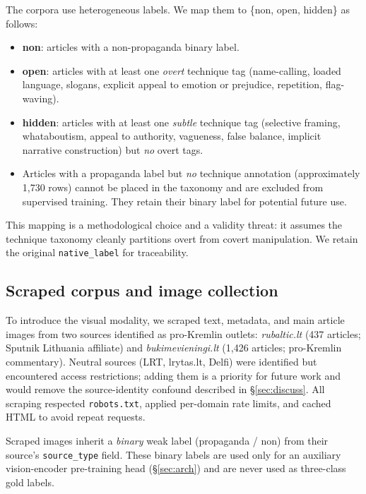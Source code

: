 \documentclass[12pt,a4paper]{article}
\begin{document}
The corpora use heterogeneous labels.
We map them to \{non, open, hidden\} as follows:

\begin{itemize}
  \item \textbf{non}: articles with a non-propaganda binary label.
  \item \textbf{open}: articles with at least one \emph{overt} technique tag
        (name-calling, loaded language, slogans, explicit appeal to emotion or
        prejudice, repetition, flag-waving).
  \item \textbf{hidden}: articles with at least one \emph{subtle} technique tag
        (selective framing, whataboutism, appeal to authority, vagueness,
        false balance, implicit narrative construction) but \emph{no} overt tags.
  \item Articles with a propaganda label but \emph{no} technique annotation
        (approximately 1,730 rows) cannot be placed in the taxonomy and are
        excluded from supervised training.
        They retain their binary label for potential future use.
\end{itemize}

This mapping is a methodological choice and a validity threat: it assumes the
technique taxonomy cleanly partitions overt from covert manipulation.
We retain the original \texttt{native\_label} for traceability.

\subsection{Scraped corpus and image collection}

To introduce the visual modality, we scraped text, metadata, and main article
images from two sources identified as pro-Kremlin outlets:
\textit{rubaltic.lt} (437 articles; Sputnik Lithuania affiliate) and
\textit{bukimevieningi.lt} (1,426 articles; pro-Kremlin commentary).
Neutral sources (LRT, lrytas.lt, Delfi) were identified but encountered access
restrictions; adding them is a priority for future work and would remove the
source-identity confound described in \S\ref{sec:discuss}.
All scraping respected \texttt{robots.txt}, applied per-domain rate limits,
and cached HTML to avoid repeat requests.

Scraped images inherit a \emph{binary} weak label (propaganda / non) from
their source's \texttt{source\_type} field.
These binary labels are used only for an auxiliary vision-encoder pre-training
head (\S\ref{sec:arch}) and are never used as three-class gold labels.
\end{document}
